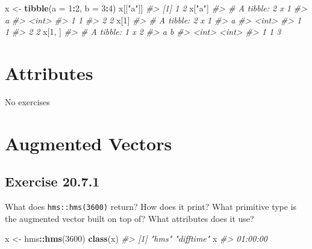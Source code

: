 \documentclass[]{book}
\newenvironment{Shaded}{\begin{snugshade}}{\end{snugshade}}
\newcommand{\CommentTok}[1]{\textcolor[rgb]{0.56,0.35,0.01}{\textit{#1}}}
\newcommand{\DataTypeTok}[1]{\textcolor[rgb]{0.13,0.29,0.53}{#1}}
\newcommand{\DecValTok}[1]{\textcolor[rgb]{0.00,0.00,0.81}{#1}}
\newcommand{\KeywordTok}[1]{\textcolor[rgb]{0.13,0.29,0.53}{\textbf{#1}}}
\newcommand{\NormalTok}[1]{#1}
\newcommand{\OperatorTok}[1]{\textcolor[rgb]{0.81,0.36,0.00}{\textbf{#1}}}
\newcommand{\StringTok}[1]{\textcolor[rgb]{0.31,0.60,0.02}{#1}}
\theoremstyle{plain}
\theoremstyle{remark}
\begin{document}
\begin{Shaded}
\begin{Highlighting}[]
\NormalTok{x <-}\StringTok{ }\KeywordTok{tibble}\NormalTok{(}\DataTypeTok{a =} \DecValTok{1}\OperatorTok{:}\DecValTok{2}\NormalTok{, }\DataTypeTok{b =} \DecValTok{3}\OperatorTok{:}\DecValTok{4}\NormalTok{)}
\NormalTok{x[[}\StringTok{"a"}\NormalTok{]]}
\CommentTok{#> [1] 1 2}
\NormalTok{x[}\StringTok{"a"}\NormalTok{]}
\CommentTok{#> # A tibble: 2 x 1}
\CommentTok{#>       a}
\CommentTok{#>   <int>}
\CommentTok{#> 1     1}
\CommentTok{#> 2     2}
\NormalTok{x[}\DecValTok{1}\NormalTok{]}
\CommentTok{#> # A tibble: 2 x 1}
\CommentTok{#>       a}
\CommentTok{#>   <int>}
\CommentTok{#> 1     1}
\CommentTok{#> 2     2}
\NormalTok{x[}\DecValTok{1}\NormalTok{, ]}
\CommentTok{#> # A tibble: 1 x 2}
\CommentTok{#>       a     b}
\CommentTok{#>   <int> <int>}
\CommentTok{#> 1     1     3}
\end{Highlighting}
\end{Shaded}

\hypertarget{attributes}{%
\section{Attributes}\label{attributes}}

No exercises

\hypertarget{augmented-vectors}{%
\section{Augmented Vectors}\label{augmented-vectors}}

\hypertarget{exercise-20.7.1}{%
\subsection*{\texorpdfstring{Exercise
{20.7.1}}{Exercise 20.7.1}}\label{exercise-20.7.1}}

What does \texttt{hms::hms(3600)} return? How does it print? What
primitive type is the augmented vector built on top of? What attributes
does it use?

\begin{Shaded}
\begin{Highlighting}[]
\NormalTok{x <-}\StringTok{ }\NormalTok{hms}\OperatorTok{::}\KeywordTok{hms}\NormalTok{(}\DecValTok{3600}\NormalTok{)}
\KeywordTok{class}\NormalTok{(x)}
\CommentTok{#> [1] "hms"      "difftime"}
\NormalTok{x}
\CommentTok{#> 01:00:00}
\end{Highlighting}
\end{Shaded}
\end{document}
